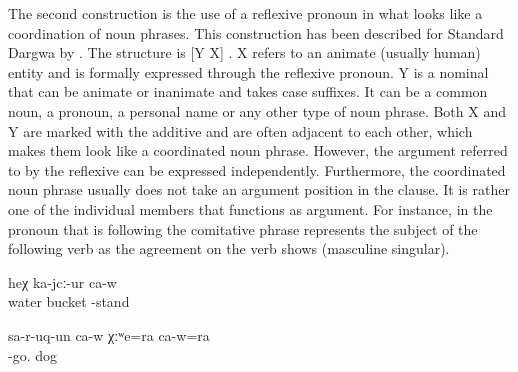The second construction is the use of a reflexive pronoun in what looks like a coordination of noun phrases. This construction has been described for Standard Dargwa by \citet{vandenBerg2004}. The structure is [Y X] . X refers to an animate (usually human) entity and is formally expressed through the reflexive pronoun. Y is a nominal that can be animate or inanimate and takes case suffixes. It can be a common noun, a pronoun, a personal name or any other type of noun phrase. Both X and Y are marked with the additive  and are often adjacent to each other, which makes them look like a coordinated noun phrase. However, the argument referred to by the reflexive can be expressed independently. Furthermore, the coordinated noun phrase usually does not take an argument position in the clause. It is rather one of the individual members that functions as argument. For instance, in  the pronoun  that is following the comitative phrase represents the subject of the following verb as the agreement on the verb shows (masculine singular).
%
\begin{exe}
	\ex	\label{ex:‎‎With a bucket of water he is standing}
	\gll	[hin-na	badra=ra	ca-w=ra]	heχ	ka-jcː-ur	ca-w\\
		water	bucket			-stand	\\
	\glt	{}

	\ex	\label{ex:He ran away with his dog}
	\gll	sa-r-uq-un	ca-w	χːʷe=ra	ca-w=ra\\
		-go.		dog	\\
	\glt	{}
\end{exe}

